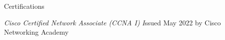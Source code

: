 \documentclass[
	10pt, %
]{resume} %
\begin{document}
\begin{rSection}{Certifications}

	\textit{Cisco Certified Network Associate (CCNA I)} \hfill \textit Issued May 2022 by Cisco Networking Academy
        

\end{rSection}






\end{document}
